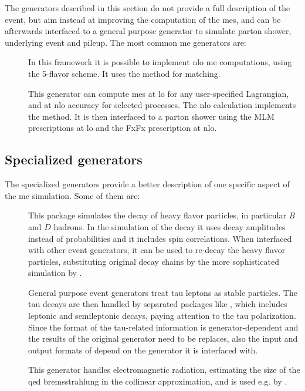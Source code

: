 The generators described in this section do not provide a full description of the event, but aim instead at improving the 
computation of the \glspl{me}, and can be afterwards interfaced to a general purpose generator to simulate parton shower, underlying event and pileup. The most common \gls{me} generators are:

\begin{description}
\item[\PowhegBox] \cite{Alioli:2010xd} In this framework it is possible to implement \gls{nlo} \gls{me} computations, using the 5-flavor scheme.
It uses the \Powheg method for matching. 

\item[\aNLO] \cite{Alwall:2014hca} This generator can compute \glspl{me} at \gls{lo} for any user-specified Lagrangian, and at \gls{nlo} accuracy for selected processes. %
The \gls{nlo} calculation implements the \mcatnlo method. 
It is then interfaced to a parton shower using the 
MLM prescriptions at \gls{lo} and the FxFx prescription at \gls{nlo}.

\end{description}

\subsection{Specialized generators}

The specialized generators provide a better description of one specific aspect of the \gls{mc} simulation. Some of them are:

\begin{description}
\item[\evtgen] \cite{Lange:2001uf} This package simulates the decay of heavy flavor particles, in particular \textit{B} and $D$ hadrons. 
In the simulation of the decay it uses decay amplitudes instead of probabilities and it includes spin correlations. 
When interfaced with other event generators, it can be used to re-decay the heavy flavor particles, 
substituting original decay chains by the more sophisticated simulation by \evtgen.

\item[\tauola] \cite{Jadach:1990mz} General purpose event generators treat tau leptons as stable particles. 
The tau decays are then handled by separated packages like \tauola, which includes leptonic and semileptonic decays, paying attention to the tau polarization. Since the format of the tau-related information is generator-dependent and the results of the original generator need to be replaces, also the input and output formats of \tauola depend on the generator it is interfaced with.

\item[\photos] \cite{Barberio:1990ms} This generator handles electromagnetic radiation, estimating the size of the \gls{qed} bremsstrahlung in the collinear approximation, and is used e.g. by \tauola. 


\end{description}


